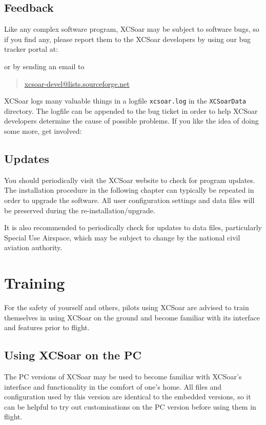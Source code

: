 \subsection*{Feedback}
Like any complex software program, XCSoar may be subject to software
bugs, so if you find any, please report them to the XCSoar developers
by using our bug tracker portal at: 
\begin{quote}
\end{quote}
or by sending an email to
\begin{quote}
\href{mailto:xcsoar-devel@lists.sourceforge.net}{xcsoar-devel@lists.sourceforge.net}
\end{quote}
XCSoar logs many valuable things in a logfile
\verb|xcsoar.log| in the \texttt{XCSoarData} directory. The logfile can be appended to the bug ticket in order to help XCSoar developers determine the cause of possible problems.
If you like the idea of doing some more, get involved:
\begin{quote}
\end{quote}

\subsection*{Updates}
You should periodically visit the XCSoar website to check for program
updates. The installation procedure in the following chapter can typically be
repeated in order to upgrade the software.  All user configuration
settings and data files will be preserved during the
re-installation/upgrade.

It is also recommended to periodically check for updates to data
files, particularly Special Use Airspace, which may be subject to
change by the national civil aviation authority.

\section{Training}
For the safety of yourself and others, pilots using XCSoar are advised to
train themselves in using XCSoar on the ground and become familiar with its
interface and features prior to flight.

\subsection*{Using XCSoar on the PC}
The PC versions of XCSoar may be used to become familiar with XCSoar's
interface and functionality in the comfort of one's home.  All files
and configuration used by this version are identical to the embedded versions,
so it can be helpful to try out customisations on the PC version before using
them in flight.

